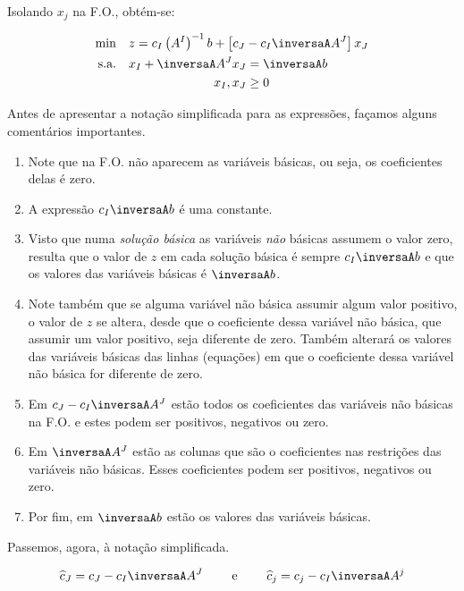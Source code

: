 Isolando $ x_j $ na F.O., obtém-se:

\begin{align*}
  \min \quad        & z = c_I \left(A^{I}\right)^{-1}b + \left[c_J - c_I\inversaA A^J\right] x_J \\
  \text{s.a.} \quad &
                      \begin{aligned}[t]
                        x_I + \inversaA A^{J} x_J &= \inversaA b \\
                                         x_I, x_J &\geq 0
                      \end{aligned}
\end{align*}

Antes de apresentar a notação simplificada para as expressões, façamos alguns
comentários importantes.

\begin{enumerate}
  \item Note que na F.O. não aparecem as variáveis básicas, ou seja, os 
   coeficientes delas é zero.
  \item A expressão $ c_I \inversaA b $ é uma constante.
  \item Visto que numa \textit{solução básica} as variáveis \textit{não} básicas 
   assumem o valor zero, resulta que o valor de $ z $ em cada solução básica é
   sempre $c_I \inversaA b $ e que os valores das variáveis básicas é 
   $ \inversaA b $.
  \item Note também que se alguma variável não básica assumir algum valor 
   positivo, o valor de $ z $ se altera, desde que o coeficiente dessa variável
   não básica, que assumir um valor positivo, seja diferente de zero.
   Também alterará os valores das variáveis básicas das linhas (equações) em que
   o coeficiente dessa variável não básica  for diferente de zero.
  \item Em $ c_J - c_I\inversaA A^J $ estão todos os coeficientes das variáveis
   não básicas na F.O. e estes podem ser positivos, negativos ou zero.
  \item Em $ \inversaA A^{J} $ estão as colunas que são o coeficientes nas 
   restrições das variáveis não básicas.
   Esses coeficientes podem ser positivos, negativos ou zero.
  \item Por fim, em $ \inversaA b $ estão os valores das variáveis básicas.
\end{enumerate}

Passemos, agora, à notação simplificada.

\[
  \widehat{c}_J = c_J - c_I \inversaA A^J
  \qquad
  \text{ e }  
  \qquad
  \widehat{c}_j = c_j - c_I \inversaA A^j
\]

